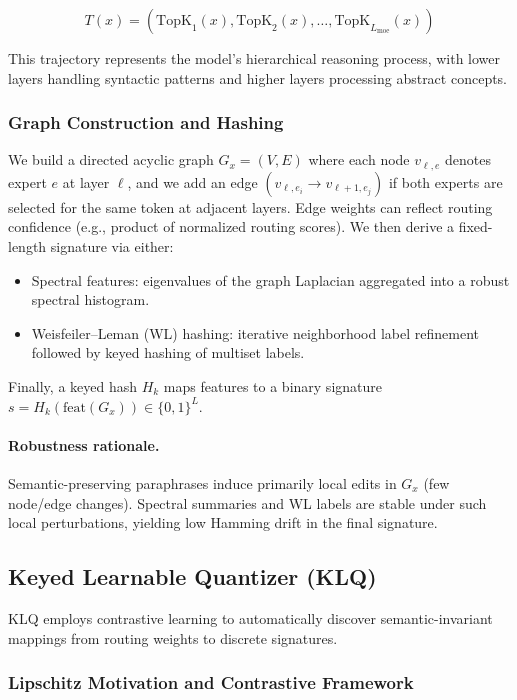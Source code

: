 \begin{equation}
T(x) = (\text{TopK}_1(x), \text{TopK}_2(x), \ldots, \text{TopK}_{L_{\text{moe}}}(x))
\end{equation}

This trajectory represents the model's hierarchical reasoning process, with lower layers handling syntactic patterns and higher layers processing abstract concepts.

\subsubsection{Graph Construction and Hashing}

We build a directed acyclic graph $G_x=(V,E)$ where each node $v_{\ell,e}$ denotes expert $e$ at layer $\ell$, and we add an edge $(v_{\ell,e_i} \to v_{\ell+1,e_j})$ if both experts are selected for the same token at adjacent layers. Edge weights can reflect routing confidence (e.g., product of normalized routing scores). We then derive a fixed-length signature via either:
\begin{itemize}
\item Spectral features: eigenvalues of the graph Laplacian aggregated into a robust spectral histogram.
\item Weisfeiler--Leman (WL) hashing: iterative neighborhood label refinement followed by keyed hashing of multiset labels.
\end{itemize}
Finally, a keyed hash $H_k$ maps features to a binary signature $s = H_k(\text{feat}(G_x)) \in \{0,1\}^L$.

\paragraph{Robustness rationale.} Semantic-preserving paraphrases induce primarily local edits in $G_x$ (few node/edge changes). Spectral summaries and WL labels are stable under such local perturbations, yielding low Hamming drift in the final signature.

\subsection{Keyed Learnable Quantizer (KLQ)}

KLQ employs contrastive learning to automatically discover semantic-invariant mappings from routing weights to discrete signatures.

\subsubsection{Lipschitz Motivation and Contrastive Framework}

